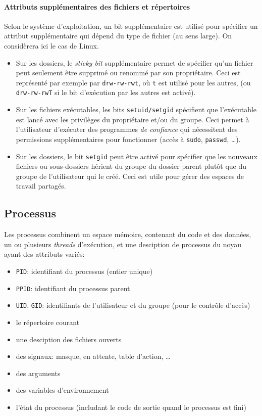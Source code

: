 \documentclass[french, toc]{../cs-classes/cs-classes}
\begin{document}
\paragraph*{Attributs supplémentaires des fichiers et répertoires}
Selon le système d'exploitation, un bit supplémentaire est utilisé pour spécifier un attribut supplémentaire qui dépend du type de fichier (au sens large). On considèrera ici le cas de Linux. 
\begin{itemize}
    \item Sur les dossiers, le \emph{sticky bit} supplémentaire permet de spécifier qu'un fichier peut seulement être supprimé ou renommé par son propriétaire. Ceci est représenté par exemple par \texttt{drw-rw-rwt}, où \texttt{t} est utilisé pour les autres, (ou \texttt{drw-rw-rwT} si le bit d'exécution par les autres est activé).
    \item Sur les fichiers exécutables, les bits \texttt{setuid/setgid} spécifient que l'exécutable est lancé avec les privilèges du propriétaire et/ou du groupe. Ceci permet à l'utilisateur d'exécuter des programmes \emph{de confiance} qui nécessitent des permissions supplémentaires pour fonctionner (accès à \texttt{sudo}, \texttt{passwd}, \dots).
    \item Sur les dossiers, le bit \texttt{setgid} peut être activé pour spécifier que les nouveaux fichiers ou sous-dossiers hérient du groupe du dossier parent plutôt que du groupe de l'utilisateur qui le créé. Ceci est utile pour gérer des espaces de travail partagés.
\end{itemize}

\subsection{Processus}
Les processus combinent un espace mémoire, contenant du code et des données, un ou plusieurs \emph{threads} d'exécution, et une desciption de processus du noyau ayant des attributs variés:
\begin{itemize}
    \item \texttt{PID}: identifiant du processus (entier unique)
    \item \texttt{PPID}: identifiant du processus parent
    \item \texttt{UID}, \texttt{GID}: identifiants de l'utilisateur et du groupe (pour le contrôle d'accès)
    \item le répertoire courant
    \item une desciption des fichiers ouverts
    \item des signaux: masque, en attente, table d'action, \dots
    \item des arguments
    \item des variables d'environnement
    \item l'état du processus (includant le code de sortie quand le processus est fini)
\end{itemize}
\end{document}
